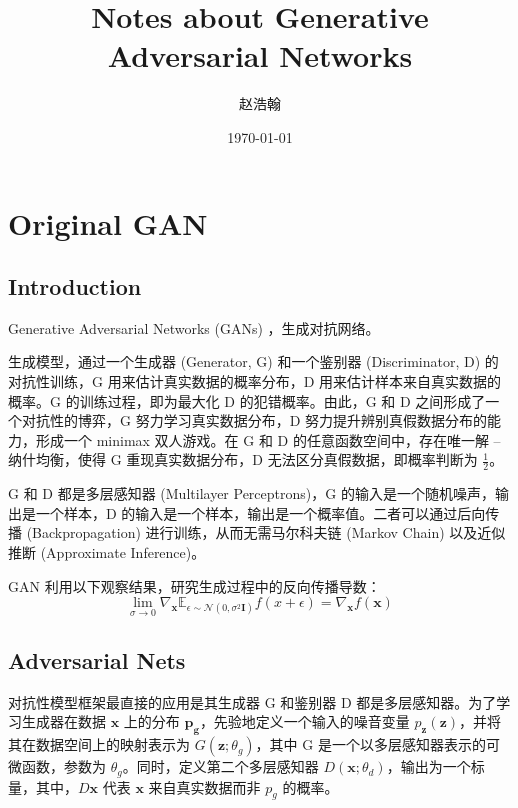 \documentclass{myarticle}
\title{Notes about Generative Adversarial Networks}
\author{赵浩翰}
\date{\today}
\begin{document}
    \maketitle
    \clearpage
    \tableofcontents
    \clearpage

    \section{Original GAN}

    \subsection{Introduction}

    Generative Adversarial Networks (GANs) \cite{goodfellow_generative_2014}，生成对抗网络。

    生成模型，通过一个生成器 (Generator, G) 和一个鉴别器 (Discriminator, D) 的对抗性训练，G 用来估计真实数据的概率分布，D 用来估计样本来自真实数据的概率。G 的训练过程，即为最大化 D 的犯错概率。由此，G 和 D 之间形成了一个对抗性的博弈，G 努力学习真实数据分布，D 努力提升辨别真假数据分布的能力，形成一个 minimax 双人游戏。在 G 和 D 的任意函数空间中，存在唯一解 -- 纳什均衡，使得 G 重现真实数据分布，D 无法区分真假数据，即概率判断为 $\frac{1}{2}$。

    G 和 D 都是多层感知器 (Multilayer Perceptrons)，G 的输入是一个随机噪声，输出是一个样本，D 的输入是一个样本，输出是一个概率值。二者可以通过后向传播 (Backpropagation) 进行训练，从而无需马尔科夫链 (Markov Chain) 以及近似推断 (Approximate Inference)。

    GAN 利用以下观察结果，研究生成过程中的反向传播导数：
    \begin{equation}
        \lim\limits_{\sigma\to0}\nabla_{\bm{x}}\mathbb{E}_{\epsilon\sim\mathcal{N}(0,\sigma^2\bm{I})}f(x+\epsilon)=\nabla_{\bm{x}}f(\bm{x})
    \end{equation}

    \subsection{Adversarial Nets}
    对抗性模型框架最直接的应用是其生成器 G 和鉴别器 D 都是多层感知器。为了学习生成器在数据 $\bm{x}$ 上的分布 $\bm{p_g}$，先验地定义一个输入的噪音变量 $p_{\bm{z}}(\bm{z})$，并将其在数据空间上的映射表示为 $G(\bm{z};\theta_g)$，其中 G 是一个以多层感知器表示的可微函数，参数为 $\theta_g$。同时，定义第二个多层感知器 $D(\bm{x};\theta_d)$，输出为一个标量，其中，$D{\bm{x}}$ 代表 $\bm{x}$ 来自真实数据而非 $p_g$ 的概率。
\end{document}
